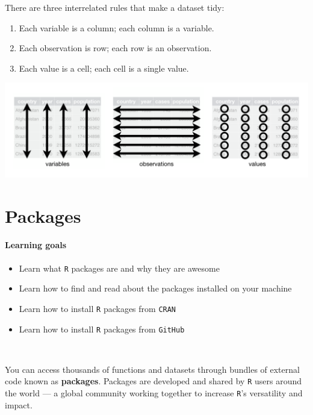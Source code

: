 \documentclass[
]{book}
\providecommand{\tightlist}{%
  \setlength{\itemsep}{0pt}\setlength{\parskip}{0pt}}
\begin{document}
There are three interrelated rules that make a dataset tidy:

\begin{enumerate}
\def\labelenumi{\arabic{enumi}.}
\tightlist
\item
  Each variable is a column; each column is a variable.
\item
  Each observation is row; each row is an observation.
\item
  Each value is a cell; each cell is a single value.
\end{enumerate}

\includegraphics[width=7.11in]{img/tidy-1}

\hypertarget{packages}{%
\chapter{Packages}\label{packages}}

\hypertarget{learning-goals-6}{%
\subsubsection*{Learning goals}\label{learning-goals-6}}

\begin{itemize}
\tightlist
\item
  Learn what \texttt{R} packages are and why they are awesome
\item
  Learn how to find and read about the packages installed on your machine
\item
  Learn how to install \texttt{R} packages from \texttt{CRAN}
\item
  Learn how to install \texttt{R} packages from \texttt{GitHub}
\end{itemize}

~

You can access thousands of functions and datasets through bundles of external code known as \textbf{packages}. Packages are developed and shared by \texttt{R} users around the world --- a global community working together to increase \texttt{R}'s versatility and impact.
\end{document}
